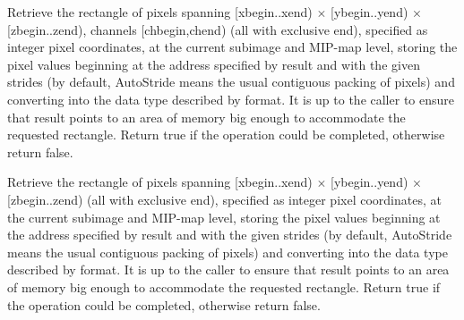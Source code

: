 
Retrieve the rectangle of pixels spanning {\cf [xbegin..xend)} $\times$
{\cf [ybegin..yend)} $\times$ {\cf [zbegin..zend)}, channels 
{\cf [chbegin,chend)} (all with exclusive
end), specified as integer pixel coordinates, at the current subimage and
MIP-map level, storing the pixel values beginning at the address
specified by {\cf result} and with the given strides (by default,
{\cf AutoStride} means the usual contiguous packing of pixels) and
converting into the data type described by {\cf format}.  It is
up to the caller to ensure that {\cf result} points to an area of
memory big enough to accommodate the requested rectangle.
Return {\cf true} if the operation could be completed, otherwise
return {\cf false}.
\apiend


Retrieve the rectangle of pixels spanning {\cf [xbegin..xend)} $\times$
{\cf [ybegin..yend)} $\times$ {\cf [zbegin..zend)} (all with exclusive
end), specified as integer pixel coordinates, at the current subimage and
MIP-map level, storing the pixel values beginning at the address
specified by {\cf result} and with the given strides (by default,
{\cf AutoStride} means the usual contiguous packing of pixels) and
converting into the data type described by {\cf format}.  It is
up to the caller to ensure that {\cf result} points to an area of
memory big enough to accommodate the requested rectangle.
Return {\cf true} if the operation could be completed, otherwise
return {\cf false}.
\apiend


